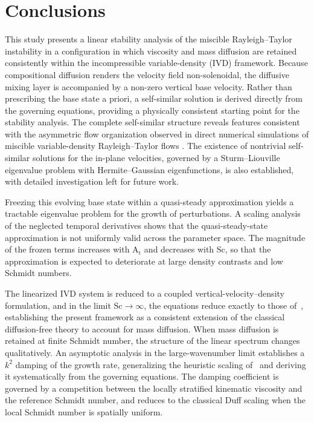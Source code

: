 \documentclass[11pt]{article}
\newcommand{\Atw}{\mathrm{A_t}}
\newcommand{\Sch}{\mathrm{Sc}}
\begin{document}
\section{Conclusions}%
\label{sec:conclusions}
This study presents a linear stability analysis of the miscible Rayleigh--Taylor instability in a configuration in which viscosity and mass diffusion are retained consistently within the incompressible variable-density (IVD) framework. Because compositional diffusion renders the velocity field non-solenoidal, the diffusive mixing layer is accompanied by a non-zero vertical base velocity. Rather than prescribing the base state a priori, a self-similar solution is derived directly from the governing equations, providing a physically consistent starting point for the stability analysis. The complete self-similar structure reveals features consistent with the asymmetric flow organization observed in direct numerical simulations of miscible variable-density Rayleigh--Taylor flows \citep{livescu-et-al-2010}. The existence of nontrivial self-similar solutions for the in-plane velocities, governed by a Sturm--Liouville eigenvalue problem with Hermite--Gaussian eigenfunctions, is also established, with detailed investigation left for future work.

Freezing this evolving base state within a quasi-steady approximation yields a tractable eigenvalue problem for the growth of perturbations. A scaling analysis of the neglected temporal derivatives shows that the quasi-steady-state approximation is not uniformly valid across the parameter space. The magnitude of the frozen terms increases with \(\Atw\) and decreases with \(\Sch\), so that the approximation is expected to deteriorate at large density contrasts and low Schmidt numbers.

The linearized IVD system is reduced to a coupled vertical-velocity--density formulation, and in the limit \(\Sch \to \infty\), the equations reduce exactly to those of~\citet{chandrasekhar-1961}, establishing the present framework as a consistent extension of the classical diffusion-free theory to account for mass diffusion. When mass diffusion is retained at finite Schmidt number, the structure of the linear spectrum changes qualitatively. An asymptotic analysis in the large-wavenumber limit establishes a \(k^2\) damping of the growth rate, generalizing the heuristic scaling of~\citet{duff-harlow-hirt-1962} and deriving it systematically from the governing equations. The damping coefficient is governed by a competition between the locally stratified kinematic viscosity and the reference Schmidt number, and reduces to the classical Duff scaling when the local Schmidt number is spatially uniform.
\end{document}
